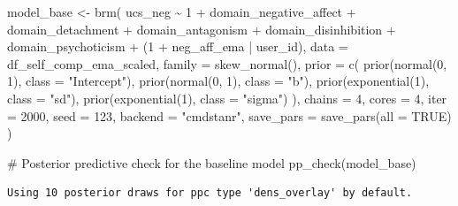 \documentclass[
  11pt,
  a4paper,
  onecolumn]{article}
\newenvironment{Shaded}{}{}
\newcommand{\AttributeTok}[1]{\textcolor[rgb]{0.84,0.23,0.29}{#1}}
\newcommand{\CommentTok}[1]{\textcolor[rgb]{0.42,0.45,0.49}{#1}}
\newcommand{\ConstantTok}[1]{\textcolor[rgb]{0.00,0.36,0.77}{#1}}
\newcommand{\DecValTok}[1]{\textcolor[rgb]{0.00,0.36,0.77}{#1}}
\newcommand{\FunctionTok}[1]{\textcolor[rgb]{0.44,0.26,0.76}{#1}}
\newcommand{\NormalTok}[1]{\textcolor[rgb]{0.14,0.16,0.18}{#1}}
\newcommand{\OtherTok}[1]{\textcolor[rgb]{0.44,0.26,0.76}{#1}}
\newcommand{\SpecialCharTok}[1]{\textcolor[rgb]{0.00,0.36,0.77}{#1}}
\newcommand{\StringTok}[1]{\textcolor[rgb]{0.01,0.18,0.38}{#1}}
\begin{document}
\begin{Shaded}
\begin{Highlighting}[]
\NormalTok{model\_base }\OtherTok{\textless{}{-}} \FunctionTok{brm}\NormalTok{(}
\NormalTok{  ucs\_neg }\SpecialCharTok{\textasciitilde{}} \DecValTok{1} \SpecialCharTok{+}  
\NormalTok{    domain\_negative\_affect }\SpecialCharTok{+}\NormalTok{ domain\_detachment }\SpecialCharTok{+}
\NormalTok{    domain\_antagonism }\SpecialCharTok{+}\NormalTok{ domain\_disinhibition }\SpecialCharTok{+}\NormalTok{ domain\_psychoticism }\SpecialCharTok{+} 
\NormalTok{    (}\DecValTok{1} \SpecialCharTok{+}\NormalTok{ neg\_aff\_ema }\SpecialCharTok{|}\NormalTok{ user\_id),}
  \AttributeTok{data =}\NormalTok{ df\_self\_comp\_ema\_scaled,}
  \AttributeTok{family =} \FunctionTok{skew\_normal}\NormalTok{(),}
  \AttributeTok{prior =} \FunctionTok{c}\NormalTok{(}
    \FunctionTok{prior}\NormalTok{(}\FunctionTok{normal}\NormalTok{(}\DecValTok{0}\NormalTok{, }\DecValTok{1}\NormalTok{), }\AttributeTok{class =} \StringTok{"Intercept"}\NormalTok{),}
    \FunctionTok{prior}\NormalTok{(}\FunctionTok{normal}\NormalTok{(}\DecValTok{0}\NormalTok{, }\DecValTok{1}\NormalTok{), }\AttributeTok{class =} \StringTok{"b"}\NormalTok{),}
    \FunctionTok{prior}\NormalTok{(}\FunctionTok{exponential}\NormalTok{(}\DecValTok{1}\NormalTok{), }\AttributeTok{class =} \StringTok{"sd"}\NormalTok{),}
    \FunctionTok{prior}\NormalTok{(}\FunctionTok{exponential}\NormalTok{(}\DecValTok{1}\NormalTok{), }\AttributeTok{class =} \StringTok{"sigma"}\NormalTok{)}
\NormalTok{  ),}
  \AttributeTok{chains =} \DecValTok{4}\NormalTok{,}
  \AttributeTok{cores =} \DecValTok{4}\NormalTok{,}
  \AttributeTok{iter =} \DecValTok{2000}\NormalTok{,}
  \AttributeTok{seed =} \DecValTok{123}\NormalTok{,}
  \AttributeTok{backend =} \StringTok{"cmdstanr"}\NormalTok{,}
  \AttributeTok{save\_pars =} \FunctionTok{save\_pars}\NormalTok{(}\AttributeTok{all =} \ConstantTok{TRUE}\NormalTok{)}
\NormalTok{)}
\end{Highlighting}
\end{Shaded}

\begin{Shaded}
\begin{Highlighting}[]
\CommentTok{\# Posterior predictive check for the baseline model}
\FunctionTok{pp\_check}\NormalTok{(model\_base)}
\end{Highlighting}
\end{Shaded}

\begin{verbatim}
Using 10 posterior draws for ppc type 'dens_overlay' by default.
\end{verbatim}
\end{document}

